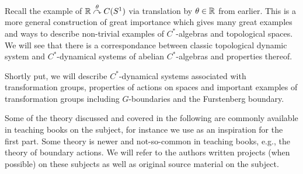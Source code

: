 Recall the example of $\mathbb{R} \stackrel{\theta}{\curvearrowright} C(S^1)$ via translation by $\theta \in \mathbb{R}$ from earlier. This is a more general construction of great importance which gives many great examples and ways to describe non-trivial examples of $C^*$-algebras and topological spaces. We will see that there is a correspondance between classic topological dynamic system and $C^*$-dynamical systems of abelian $C^*$-algebras and properties thereof. 

Shortly put, we will describe $C^*$-dynamical systems associated with transformation groups, properties of actions on spaces and important examples of transformation groups including $G$-boundaries and the Furstenberg boundary. 

Some of the theory discussed and covered in the following are commonly available in teaching books on the subject, for instance we use \cite{williamscrossed} as an inspiration for the first part. Some theory is newer and not-so-common in teaching books, e.g., the theory of boundary actions. We will refer to the authors written projects (when possible) on these subjects as well as original source material on the subject.

